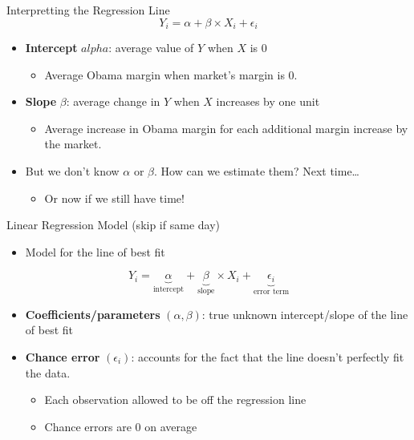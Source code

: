 \documentclass[
  ignorenonframetext,
]{beamer}
\providecommand{\tightlist}{%
  \setlength{\itemsep}{0pt}\setlength{\parskip}{0pt}}
\begin{document}
\begin{frame}{Interpretting the Regression Line}
\label{interpretting-the-regression-line}
\[
Y_i = \alpha + \beta \times X_i + \epsilon_i
\]

\pause

\begin{itemize}
\tightlist
\item
  \textbf{Intercept} \(alpha\): average value of \(Y\) when \(X\) is 0

  \begin{itemize}
  \tightlist
  \item
    Average Obama margin when market's margin is 0. \pause
  \end{itemize}
\item
  \textbf{Slope} \(\beta\): average change in \(Y\) when \(X\) increases
  by one unit

  \begin{itemize}
  \tightlist
  \item
    Average increase in Obama margin for each additional margin increase
    by the market. \pause
  \end{itemize}
\item
  But we don't know \(\alpha\) or \(\beta\). How can we estimate them?
  Next time\ldots{} \pause

  \begin{itemize}
  \tightlist
  \item
    Or now if we still have time!
  \end{itemize}
\end{itemize}
\end{frame}

\begin{frame}{Linear Regression Model (skip if same day)}
\label{linear-regression-model-skip-if-same-day}
\begin{itemize}
\tightlist
\item
  Model for the line of best fit
\end{itemize}

\[
Y_i = \underbrace{\alpha}_{\textrm{intercept}} + \underbrace{\beta}_{\textrm{slope}} \times X_i + \underbrace{\epsilon_i}_{\textrm{error term}}
\]

\begin{itemize}
\tightlist
\item
  \textbf{Coefficients/parameters} \((\alpha,\beta)\): true unknown
  intercept/slope of the line of best fit
\item
  \textbf{Chance error} \((\epsilon_i)\): accounts for the fact that the
  line doesn't perfectly fit the data.

  \begin{itemize}
  \tightlist
  \item
    Each observation allowed to be off the regression line
  \item
    Chance errors are 0 on average
  \end{itemize}
\end{itemize}
\end{frame}
\end{document}
